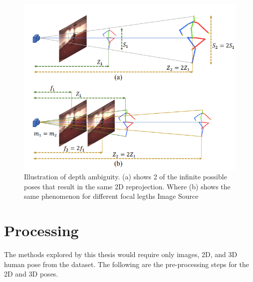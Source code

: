 \begin{figure}[!h]
    \centering
    \includegraphics[scale=0.4]{figures/background/depthambi.png}
    \caption{Illustration of depth ambiguity. (a) shows 2 of the infinite possible poses that result in the same 2D reprojection. Where (b) shows the same phenomenon for different focal legths
    Image Source \cite{poselifter}}
    \label{fig:depthambi}
\end{figure}










\section{Processing}

The methods explored by this thesis would require only images, 2D, and 3D human pose from the dataset. The following are the pre-processing steps for the 2D and 3D poses.


